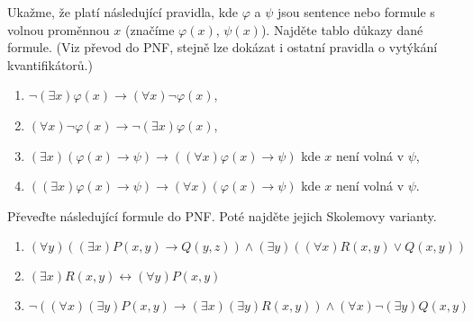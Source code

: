 \documentclass[a4paper,12pt]{article}
\begin{document}
\medskip\begin{problem}
    Ukažme, že platí následující pravidla, kde
   $\varphi$ a $\psi$ jsou sentence nebo formule s volnou proměnnou $x$ (značíme $\varphi(x)$, $\psi(x)$). Najděte tablo důkazy dané formule.  (Viz převod do PNF, stejně lze dokázat i ostatní pravidla o vytýkání kvantifikátorů.)
\begin{enumerate}
    \item $\neg(\exists x)\varphi(x)\to (\forall x)\neg \varphi(x)$,
    \item $(\forall x)\neg \varphi(x)\to \neg(\exists x)\varphi(x)$,
    \item $(\exists x)(\varphi(x)\to\psi)\to((\forall x)\varphi(x)\to \psi)$ kde $x$ není volná v $\psi$,
    \item $((\exists x)\varphi(x)\to\psi)\to(\forall x)(\varphi(x)\to \psi)$ kde $x$ není volná v $\psi$.
\end{enumerate}
\end{problem}


\medskip\begin{problem} Převeďte následující formule do PNF. Poté najděte jejich Skolemovy varianty.
    \begin{enumerate}
        \item $(\forall y)((\exists x)P(x,y)\to Q(y,z))\wedge (\exists y)((\forall x)R(x,y)\vee Q(x,y))$
        \item $(\exists x)R(x,y)\leftrightarrow (\forall y)P(x,y)$
        \item $\neg((\forall x)(\exists y)P(x,y)\to (\exists x)(\exists y)R(x,y))\wedge(\forall x)\neg(\exists y)Q(x,y)$
    \end{enumerate}
\end{problem}
\end{document}
